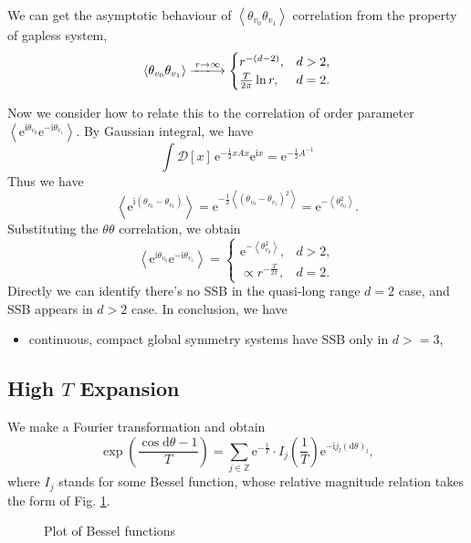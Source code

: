 We can get the asymptotic behaviour of $\left< \theta_{v_0}\theta_{v_1} \right>$ correlation from the property of gapless system,
\begin{equation}
  \left< \theta_{v_0} \theta_{v_1} \right> \xlongrightarrow{r \to \infty }
  \begin{cases}
    r^{-\left( d-2 \right)}, & d>2, \\
    \frac{T}{2\pi } \ln r, & d=2.
  \end{cases}
\end{equation}

Now we consider how to relate this to the correlation of order parameter $\left< \mathrm{e}^{\mathrm{i}\theta_{v_0}} \mathrm{e}^{-\mathrm{i} \theta_{v_1}} \right>$. By Gaussian integral, we have
\begin{equation}
  \int \mathcal{D} [x]\, \mathrm{e}^{- \frac{1}{2} x A x} \mathrm{e}^{\mathrm{i} x} = \mathrm{e}^{- \frac{1}{2} A^{-1}}
\end{equation}
Thus we have
\begin{equation}
  \left< \mathrm{e}^{\mathrm{i}\left( \theta_{v_0} - \theta_{v_1} \right)} \right> = \mathrm{e}^{- \frac{1}{2} \left< \left( \theta_{v_0} - \theta_{v_1} \right)^{2} \right>} = \mathrm{e}^{-\left< \theta_{v_0}^{2} \right>}.
\end{equation}
Substituting the $\theta\theta$ correlation, we obtain
\begin{equation}
  \left< \mathrm{e}^{\mathrm{i}\theta_{v_0}} \mathrm{e}^{-\mathrm{i}\theta_{v_1}} \right> = 
  \begin{cases}
    \mathrm{e}^{-\left< \theta_{v_0}^{2} \right>}, & d>2,
    \\
    \propto r^{- \frac{T}{2\pi }}, & d=2.
  \end{cases}
\end{equation}
Directly we can identify there's no SSB in the quasi-long range $d=2$ case, and SSB appears in $d > 2$ case.
In conclusion, we have
\begin{itemize}
  \item continuous, compact global symmetry systems have SSB only in $d>=3$,
\end{itemize}

\subsection{High $T$ Expansion}

We make a Fourier transformation and obtain
\begin{equation}
  \exp \left( \frac{\cos \mathrm{d} \theta - 1}{T} \right) = \sum_{j \in \mathbb{Z}} \mathrm{e}^{-\frac{1}{T}} \cdot I_{j} \left( \frac{1}{T} \right)\mathrm{e}^{- \mathrm{i} j_{l} \left( \mathrm{d} \theta \right)_{l}},
\end{equation}
where $I_{j}$ stands for some Bessel function, whose relative magnitude relation takes the form of Fig. \ref{fig:plot-of-bessel-functions}.
\begin{figure}[ht]
    \centering
    \caption{Plot of Bessel functions}
    \label{fig:plot-of-bessel-functions}
\end{figure}

